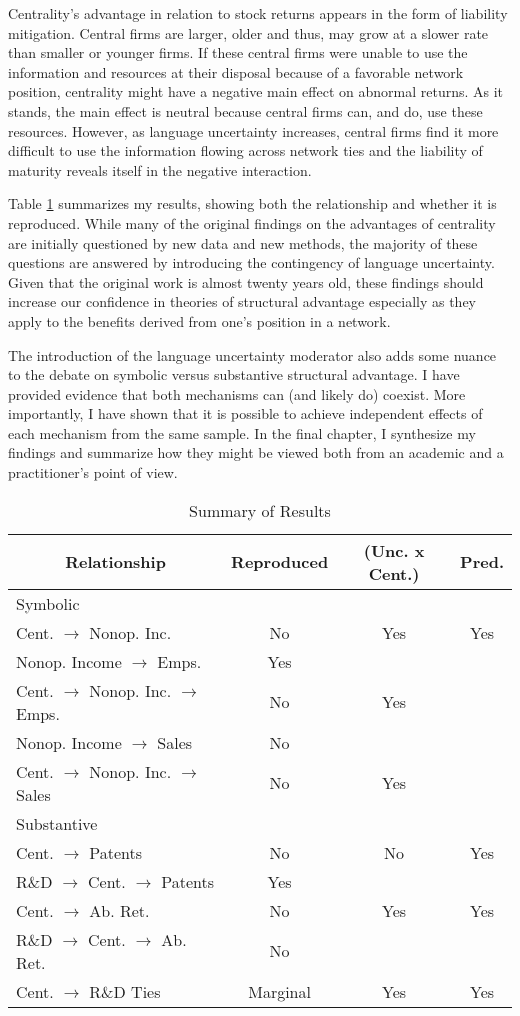 Centrality's advantage in relation to stock returns appears in the form of liability mitigation. Central firms are larger, older and thus, may grow at a slower rate than smaller or younger firms. If these central firms were unable to use the information and resources at their disposal because of a favorable network position, centrality might have a negative main effect on abnormal returns. As it stands, the main effect is neutral because central firms can, and do, use these resources. However, as language uncertainty increases, central firms find it more difficult to use the information flowing across network ties and the liability of maturity reveals itself in the negative interaction.

Table \ref{summary} summarizes my results, showing both the relationship and whether it is reproduced. While many of the original findings on the advantages of centrality are initially questioned by new data and new methods, the majority of these questions are answered by introducing the contingency of language uncertainty. Given that the original work is almost twenty years old, these findings should increase our confidence in theories of structural advantage especially as they apply to the benefits derived from one's position in a network.

The introduction of the language uncertainty moderator also adds some nuance to the debate on symbolic versus substantive structural advantage. I have provided evidence that both mechanisms can (and likely do) coexist. More importantly, I have shown that it is possible to achieve independent effects of each mechanism from the same sample. In the final chapter, I synthesize my findings and summarize how they might be viewed both from an academic and a practitioner's point of view.

\begin{table}[htbp]\centering \caption{Summary of Results\label{summary}}
\begin{tabular}{l  c  c  c  }\hline\hline
\multicolumn{1}{c}{Relationship} & Reproduced & (Unc. x Cent.) & Pred. \\ \hline
Symbolic \\ \hline
Cent. $\rightarrow$ Nonop. Inc. & No & Yes & Yes\\
Nonop. Income $\rightarrow$ Emps. & Yes\\
Cent. $\rightarrow$ Nonop. Inc. $\rightarrow$ Emps. & No & Yes\\
Nonop. Income $\rightarrow$ Sales & No\\
Cent. $\rightarrow$ Nonop. Inc. $\rightarrow$ Sales & No & Yes\\
\hline
Substantive \\ \hline
Cent. $\rightarrow$ Patents & No & No & Yes\\
R\&D $\rightarrow$ Cent. $\rightarrow$ Patents & Yes\\
Cent. $\rightarrow$ Ab. Ret. & No & Yes & Yes\\
R\&D $\rightarrow$ Cent. $\rightarrow$ Ab. Ret. & No\\
Cent. $\rightarrow$ R\&D Ties & Marginal & Yes & Yes\\
\hline \hline 
 \end{tabular}
\end{table}


